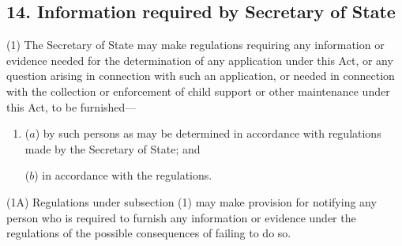 \documentclass[12pt,a4paper]{article}
\begin{document}
\subsection{14. Information required by Secretary of State}

(1) The Secretary of State may make regulations requiring any information or evidence needed for the determination of any application under this Act, or any question arising in connection with such an application, or needed in connection with the collection or enforcement of child support or other maintenance under this Act, to be furnished—
\begin{enumerate}\item[]
($a$) by such persons as may be determined in accordance with regulations made by the Secretary of State; and

($b$) in accordance with the regulations.
\end{enumerate}

(1A) Regulations under subsection (1) may make provision for notifying any person who is required to furnish any information or evidence under the regulations of the possible consequences of failing to do so.

%
%
%
\end{document}
